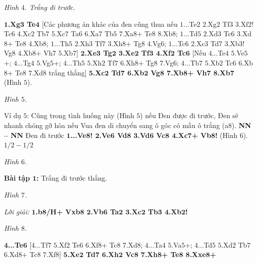 \begin{multicols}{2}
\begin{center}
		\newgame
		\scalebox{0.85}\showboard
		\vskip 0.1cm
		\textit{\small\color{gocco}Hình $4$. Trắng đi trước.}
	\end{center}
	\textbf{\color{gocco}$\pmb{1}$.Xg$\pmb{3}$ Te$\pmb{4}$} [Các phương án khác của đen cũng thua nếu $1$...Te$2$ $2$.Xg$2$ Tf$3$ $3$.Xf$2$! Tc$6$ $4$.Xc$2$ Tb$7$ $5$.Xc$7$ Ta$6$ $6$.Xa$7$ Tb$5$ $7$.Xa$8$+ Te$8$ $8$.Xb$8$; $1$...Td$5$ $2$.Xd$3$ Tc$6$ $3$.Xd$8$+ Te$8$ $4$.Xb$8$; $1$...Th$5$ $2$.Xh$3$ Tf$7$ $3$.Xh$8$+ Tg$8$ $4$.Vg$6$; $1$...Tc$6$ $2$.Xc$3$ Td$7$ $3$.Xb$3$! Vg$8$ $4$.Xb$8$+ Vh$7$ $5$.Xb$7$]
	\vskip 0.1cm
	\textbf{\color{gocco}$\pmb{2}$.Xe$\pmb{3}$ Tg$\pmb{2}$ $\pmb{3}$.Xe$\pmb{2}$ Tf$\pmb{3}$ $\pmb{4}$.Xf$\pmb{2}$ Tc$\pmb{6}$} [Nếu $4$...Te$4$ $5$.Ve$5$+; $4$...Tg$4$ $5$.Vg$5$+; $4$...Th$5$ $5$.Xh$2$ Tf$7$ $6$.Xh$8$+ Tg$8$ $7$.Vg$6$; $4$...Tb$7$ $5$.Xb$2$ Tc$6$ $6$.Xb$8$+ Te$8$ $7$.Xd$8$ trắng thắng]
	\vskip 0.1cm
	\textbf{\color{gocco}$\pmb{5}$.Xc$\pmb{2}$ Td$\pmb{7}$ $\pmb{6}$.Xb$\pmb{2}$ Vg$\pmb{8}$ $\pmb{7}$.Xb$\pmb{8}$+ Vh$\pmb{7}$ $\pmb{8}$.Xb$\pmb{7}$} (Hình $5$).
	\begin{center}
		\newgame
		\scalebox{0.85}\showboard
		\vskip 0.1cm
		\textit{\small\color{gocco}Hình $5$.}
	\end{center}
	Ví dụ $5$:
	\vskip 0.1cm
	Cũng trong tình huống này (Hình $5$) nếu Đen được đi trước, Đen sẽ nhanh chóng gỡ hòa nếu Vua đen di chuyển  sang ô góc có mầu ô trắng (a$8$).
	\vskip 0.1cm
	\textbf{\color{gocco}NN -- NN}
	\vskip 0.1cm
	Đen đi trước
	\vskip 0.1cm
	\textbf{\color{gocco}$\pmb{1}$...Ve$\pmb{8}$! $\pmb{2}$.Ve$\pmb{6}$ Vd$\pmb{8}$ $\pmb{3}$.Vd$\pmb{6}$ Vc$\pmb{8}$ $\pmb{4}$.Xc$\pmb{7}$+ Vb$\pmb{8}$!} (Hình $6$).
	\vskip 0.1cm
	$1/2 - 1/2$
	\begin{center}
		\newgame
		\scalebox{0.85}\showboard
		\vskip 0.1cm
		\textit{\small\color{gocco}Hình $6$.}
	\end{center}
	\textbf{\color{gocco}Bài tập $\pmb{1}$:} Trắng đi trước thắng.
	\begin{center}
		\newgame
		\scalebox{0.85}\showboard
		\vskip 0.1cm
		\textit{\small\color{gocco}Hình $7$.}
	\end{center}
	\textit{Lời giải:}
	\vskip 0.1cm
	\textbf{\color{gocco}$\pmb{1}$.b$\pmb{8}$/H+ Vxb$\pmb{8}$ $\pmb{2}$.Vb$\pmb{6}$ Ta$\pmb{2}$ $\pmb{3}$.Xc$\pmb{2}$ Tb$\pmb{3}$ $\pmb{4}$.Xb$\pmb{2}$!}
	\begin{center}
		\newgame
		\scalebox{0.85}\showboard
		\vskip 0.1cm
		\textit{\small\color{gocco}Hình $8$.}
	\end{center}
	\textbf{\color{gocco}$\pmb{4}$...Te$\pmb{6}$} [$4$...Tf$7$ $5$.Xf$2$ Te$6$ $6$.Xf$8$+ Tc$8$ $7$.Xd$8$; $4$...Ta$4$ $5$.Va$5$+; $4$...Td$5$ $5$.Xd$2$ Tb$7$ $6$.Xd$8$+ Tc$8$ $7$.Xf$8$]
	\vskip 0.1cm
	\textbf{\color{gocco}$\pmb{5}$.Xe$\pmb{2}$ Td$\pmb{7}$ $\pmb{6}$.Xh$\pmb{2}$ Vc$\pmb{8}$ $\pmb{7}$.Xh$\pmb{8}$+ Te$\pmb{8}$ $\pmb{8}$.Xxe$\pmb{8}$+}
\end{multicols}




